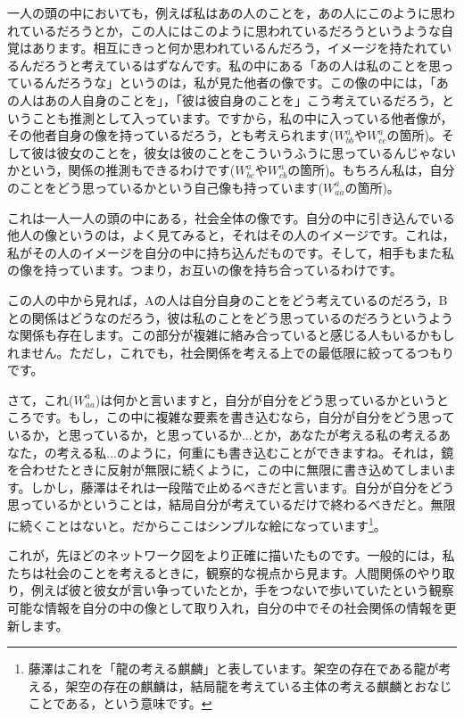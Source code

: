 \documentclass{ltjsbook}
\begin{document}
一人の頭の中においても，例えば私はあの人のことを，あの人にこのように思われているだろうとか，この人にはこのように思われているだろうというような自覚はあります。相互にきっと何か思われているんだろう，イメージを持たれているんだろうと考えているはずなんです。私の中にある「あの人は私のことを思っているんだろうな」というのは，私が見た他者の像です。この像の中には，「あの人はあの人自身のことを」，「彼は彼自身のことを」こう考えているだろう，ということも推測として入っています。ですから，私の中に入っている他者像が，その他者自身の像を持っているだろう，とも考えられます($W_{bb}^{a}$や$W_{cc}^{a}$の箇所)。そして彼は彼女のことを，彼女は彼のことをこういうふうに思っているんじゃないかという，関係の推測もできるわけです($W_{bc}^{a}$や$W_{cb}^{a}$の箇所)。もちろん私は，自分のことをどう思っているかという自己像も持っています($W_{aa}^{a}$の箇所)。

これは一人一人の頭の中にある，社会全体の像です。自分の中に引き込んでいる他人の像というのは，よく見てみると，それはその人のイメージです。これは，私がその人のイメージを自分の中に持ち込んだものです。そして，相手もまた私の像を持っています。つまり，お互いの像を持ち合っているわけです。

この人の中から見れば，Aの人は自分自身のことをどう考えているのだろう，Bとの関係はどうなのだろう，彼は私のことをどう思っているのだろうというような関係も存在します。この部分が複雑に絡み合っていると感じる人もいるかもしれません。ただし，これでも，社会関係を考える上での最低限に絞ってるつもりです。

さて，これ($W_{aa}^{a}$)は何かと言いますと，自分が自分をどう思っているかというところです。もし，この中に複雑な要素を書き込むなら，自分が自分をどう思っているか，と思っているか，と思っているか...とか，あなたが考える私の考えるあなた，の考える私...のように，何重にも書き込むことができますね。それは，鏡を合わせたときに反射が無限に続くように，この中に無限に書き込めてしまいます。しかし，藤澤はそれは一段階で止めるべきだと言います。自分が自分をどう思っているかということは，結局自分が考えているだけで終わるべきだと。無限に続くことはないと。だからここはシンプルな絵になっています\footnote{藤澤はこれを「龍の考える麒麟」と表しています。架空の存在である龍が考える，架空の存在の麒麟は，結局龍を考えている主体の考える麒麟とおなじことである，という意味です。}。

これが，先ほどのネットワーク図をより正確に描いたものです。一般的には，私たちは社会のことを考えるときに，観察的な視点から見ます。人間関係のやり取り，例えば彼と彼女が言い争っていたとか，手をつないで歩いていたという観察可能な情報を自分の中の像として取り入れ，自分の中でその社会関係の情報を更新します。
\end{document}
